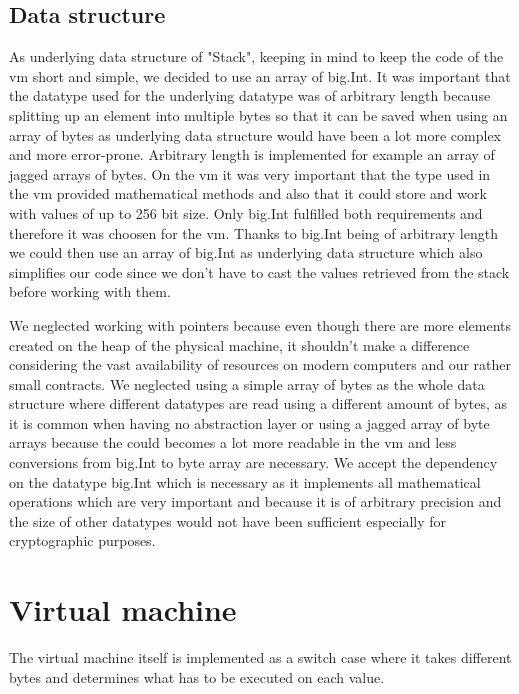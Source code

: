 \subsection{Data structure}
As underlying data structure of "Stack", keeping in mind to keep the code of the vm short and simple, we decided to use an array of big.Int. It was important that the datatype used for the underlying datatype was of arbitrary length because splitting up an element into multiple bytes so that it can be saved when using an array of bytes as underlying data structure would have been a lot more complex and more error-prone. Arbitrary length is implemented for example an array of jagged arrays of bytes. On the vm it was very important that the type used in the vm provided mathematical methods and also that it could store and work with values of up to 256 bit size. Only big.Int fulfilled both requirements and therefore it was choosen for the vm. Thanks to big.Int being of arbitrary length we could then use an array of big.Int as underlying data structure which also simplifies our code since we don't have to cast the values retrieved from the stack before working with them.

We neglected working with pointers because even though there are more elements created on the heap of the physical machine, it shouldn't make a difference considering the vast availability of resources on modern computers and our rather small contracts. We neglected using a simple array of bytes as the whole data structure where different datatypes are read using a different amount of bytes, as it is common when having no abstraction layer or using a jagged array of byte arrays because the could becomes a lot more readable in the vm and less conversions from big.Int to byte array are necessary. We accept the dependency on the datatype big.Int which is necessary as it implements all mathematical operations which are very important and because it is of arbitrary precision and the size of other datatypes would not have been sufficient especially for cryptographic purposes.

\section{Virtual machine}
The virtual machine itself is implemented as a switch case where it takes different bytes and determines what has to be executed on each value.

